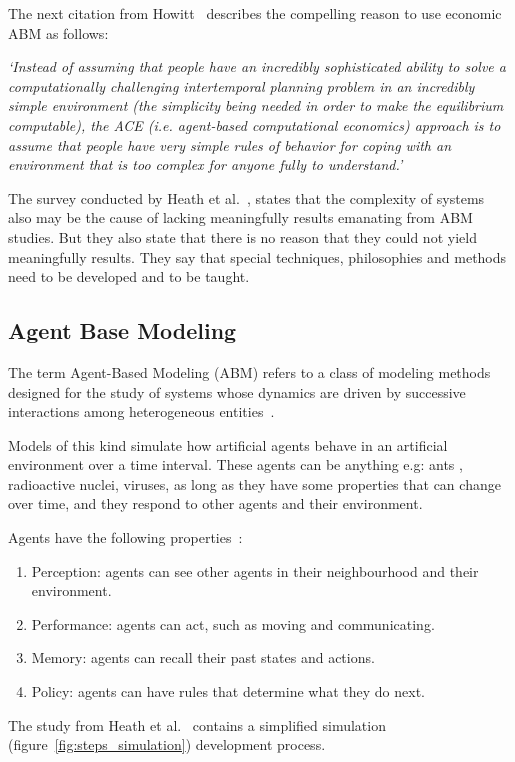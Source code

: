 The next citation from Howitt~\cite{howitt2012have} describes the compelling reason to use economic ABM as follows:

\textit{`Instead of assuming that people have an incredibly sophisticated ability to solve a computationally challenging intertemporal planning problem in an incredibly simple environment (the simplicity being needed in order to make the equilibrium computable), the ACE (i.e.
agent-based computational economics) approach is to assume that people have very simple rules of behavior for coping with an environment that is too complex for anyone fully to understand.'}

The survey conducted by Heath et al.~\cite{heath2009survey}, states that the complexity of systems also may be the cause of lacking meaningfully results emanating from ABM studies.
But they also state that there is no reason that they could not yield meaningfully results.
They say that special techniques, philosophies and methods need to be developed and to be taught.

\subsection{Agent Base Modeling}\label{subsec:agent-base-modeling}
The term Agent-Based Modeling (ABM) refers to a class of modeling methods designed for the study of systems whose dynamics are driven by successive interactions among heterogeneous entities~\cite{tesfatsion2023agent}.

Models of this kind simulate how artificial agents behave in an artificial environment over a time interval.
These agents can be anything e.g: ants , radioactive nuclei, viruses, as long as they have some properties that can change over time, and they respond to other agents and their environment.

Agents have the following properties~\cite{hamill2016agent}:
\begin{enumerate}
  \item Perception: agents can see other agents in their neighbourhood and their environment.
  \item Performance: agents can act, such as moving and communicating.
  \item Memory: agents can recall their past states and actions.
  \item Policy: agents can have rules that determine what they do next.
\end{enumerate}

The study from Heath et al.~\cite{heath2009survey} contains a simplified simulation (figure~\ref{fig:steps_simulation}) development process.

